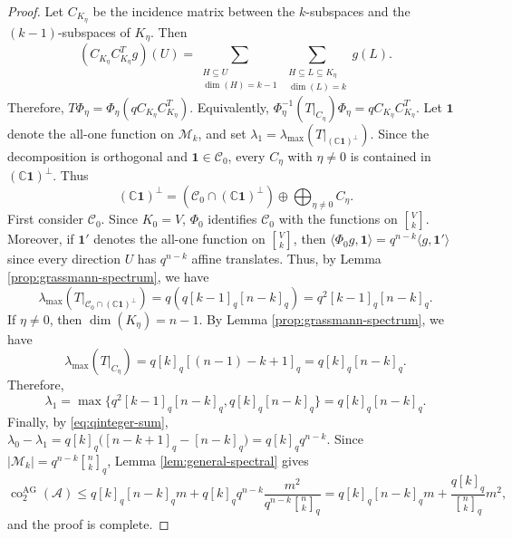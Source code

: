 \documentclass[11pt]{article}
\theoremstyle{definition}
\newcommand{\Gr}[2]{\genfrac{[}{]}{0pt}{}{#1}{#2}}
\newcommand{\qbinom}[2]{\genfrac{[}{]}{0pt}{}{#1}{#2}_q}
\begin{document}
\begin{proof}
Let $C_{K_\eta}$ be the incidence matrix between the $k$-subspaces and the $(k-1)$-subspaces of $K_\eta$. Then 
\[(C_{K_\eta} C_{K_\eta}^T g)(U) = \sum_{\substack{H\subseteq U \\ \dim (H)= k-1}} \sum_{\substack{H\subseteq L\subseteq K_\eta \\ \dim(L) = k}} g(L).\]
Therefore, $T\Phi_\eta=\Phi_\eta(q C_{K_\eta}C_{K_\eta}^T)$. Equivalently, $\Phi_\eta^{-1} \left( T |_{C_\eta} \right) \Phi_\eta = q C_{K_\eta} C_{K_\eta}^T$. Let $\mathbf{1}$ denote the all-one function on $\mathcal{M}_k$, and set $\lambda_1= \lambda_{\max} \left( T |_{(\mathbb C \mathbf{1})^\perp} \right)$. Since the decomposition is orthogonal and $\mathbf{1} \in \mathcal{C}_0$, every $C_\eta$ with $\eta \neq 0$ is contained in $(\mathbb{C}\mathbf{1})^\perp$. Thus  
\[(\mathbb{C}\mathbf{1})^\perp = (\mathcal{C}_0 \cap (\mathbb{C}\mathbf{1})^\perp) \oplus \bigoplus_{\eta \neq 0} C_\eta.\]
First consider $\mathcal C_0$. Since $K_0 = V$,  
$\Phi_0$ identifies $\mathcal C_0$ with the functions on  
$\Gr{V}{k}$. Moreover, if $\mathbf{1}'$ denotes the all-one function on $\Gr{V}{k}$, then $\langle \Phi_0 g, \mathbf{1} \rangle = q^{n-k} \langle g, \mathbf{1}' \rangle$ since every direction $U$ has $q^{n-k}$ affine translates. Thus, by Lemma \ref{prop:grassmann-spectrum}, we have 
\[\lambda_{\text{max}} \left( T |_{\mathcal{C}_0 \cap (\mathbb{C}\mathbf{1})^\perp} \right) = q \left( q [k-1]_q [n-k]_q \right) = q^2 [k-1]_q [n-k]_q.\]
If $\eta \neq 0$, then $\dim(K_\eta) = n-1$. By Lemma \ref{prop:grassmann-spectrum}, we have
\[\lambda_{\text{max}}(T|_{C_\eta}) = q [k]_q [(n-1) - k + 1]_q = q [k]_q [n - k]_q.\]
Therefore, 
\[\lambda_1 = \max \{ q^2[k - 1]_q[n - k]_q, q[k]_q[n - k]_q \}=q[k]_q[n-k]_q.\]
Finally, by \eqref{eq:qinteger-sum}, $\lambda_0-\lambda_1=q[k]_q\bigl([n-k+1]_q-[n-k]_q\bigr)=q[k]_qq^{n-k}$. Since $|\mathcal M_k|=q^{n-k}\qbinom{n}{k}$, Lemma \ref{lem:general-spectral} gives
\[
\operatorname{co}^{\mathrm{AG}}_2(\mathcal A)
\le q[k]_q[n-k]_qm
+q[k]_qq^{n-k}\frac{m^2}{q^{n-k}\qbinom{n}{k}}
=q[k]_q[n-k]_qm+\frac{q[k]_q}{\qbinom{n}{k}}m^2,\]
and the proof is complete.
\end{proof}
\end{document}
